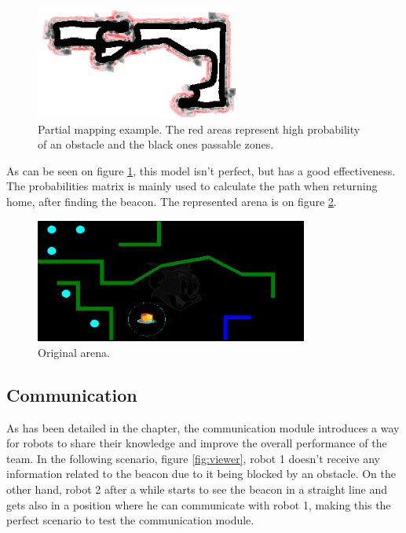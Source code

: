 \documentclass[oribibl]{llncs}
\begin{document}
\begin{figure}
  \centering
  \includegraphics[width=0.6\textwidth]{screenmap.png}
  \caption{Partial mapping example. The red areas represent high probability of an obstacle and the black ones passable zones.}
  \label{fig:screenmap}
\end{figure}

As can be seen on figure \ref{fig:screenmap}, this model isn't perfect, but has a good effectiveness. The probabilities matrix is mainly used to calculate the path when returning home, after finding the beacon. The represented arena is on figure \ref{fig:originalmap}.

\begin{figure}
  \centering
  \includegraphics[width=0.8\textwidth]{originalmap.png}
  \caption{Original arena.}
  \label{fig:originalmap}
\end{figure}

\subsection{Communication}

As has been detailed in the  chapter, the communication module introduces a way for robots to share their knowledge and improve the overall performance of the team.
In the following scenario, figure \ref{fig:viewer}, robot 1 doesn't receive any information related to the beacon due to it being blocked by an obstacle. On the other hand, robot 2 after a while starts to see the beacon in a straight line and gets also in a position where he can communicate with robot 1, making this the perfect scenario to test the communication module.
\end{document}
